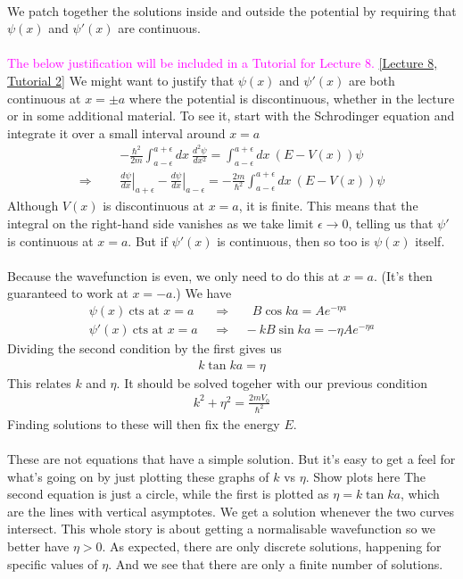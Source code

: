\documentclass[12pt]{article}
\def\be{\begin{eqnarray}}
\def\ee{\end{eqnarray}}
\newcommand{\nn}{\nonumber}
\newcommand\para{\paragraph{}}
\newcommand{\co}{\color{olive}}
\newcommand{\cblue}{\color{blue}}
\newcommand{\alyssa}{\textcolor{magenta}}
\begin{document}
\para
{\co We patch together the solutions inside and outside the potential by requiring that $\psi(x)$ and $\psi'(x)$ are continuous.}


\para
\alyssa{The below justification will be included in a Tutorial for Lecture 8.} \href{https://drive.google.com/file/d/1gpp5nltJft6RJ99iGAlz_Bhno3Qyn4yf/view?usp=drive_link}{[Lecture 8, Tutorial 2]}
{\cblue  We might want to justify that  $\psi(x)$ and $\psi'(x)$ are both continuous at $x=\pm a$ where the potential is discontinuous, whether  in the lecture or in some additional material. To see it,  start with the Schrodinger equation and integrate it over a small interval around $x=a$
%
\be && -\frac{\hbar^2}{2m} \int_{a-\epsilon}^{a+\epsilon}dx\ \frac{d^2\psi}{dx^2} =  \int_{a-\epsilon}^{a+\epsilon}dx\ (E-V(x))\psi \nn\\
\Longrightarrow \ \ \ && \left.\frac{d\psi}{dx}\right|_{a+\epsilon} - \left.\frac{d\psi}{dx}\right|_{a-\epsilon} = -\frac{2m}{\hbar^2} \int_{a-\epsilon}^{a+\epsilon}dx\ (E-V(x))\psi  \nn\ee
%
Although $V(x)$ is discontinuous at $x=a$, it is finite. This means that the integral on the right-hand side vanishes as we take limit $\epsilon \rightarrow 0$, telling us that $\psi'$ is continuous at $x=a$. But if $\psi'(x)$ is continuous, then so too is $\psi(x)$ itself. }

\para
{\co Because the wavefunction is even, we only need to do this at $x=a$. (It's then guaranteed to work at $x=-a$.) We have
%
%
\be \psi(x)\ \mbox{cts at $x=a$} \ \ \ &\Longrightarrow& \ \ \ \ \ B\cos ka = Ae^{-\eta a} \nn\\ 
\psi'(x)\ \mbox{cts at $x=a$} \ \ \ &\Longrightarrow& \ \ -kB\sin ka = -\eta Ae^{-\eta a} \nn\ee
%
}
Dividing the second condition by the first gives us 
{\co 
%
\be k\tan ka = \eta\nn\ee
%
This relates $k$ and $\eta$. It should be solved togeher with our previous condition 
%
\be k^2 + \eta^2 = \frac{2mV_0}{\hbar^2}\nn\ee
%
Finding solutions to these will then fix the energy $E$.}

\para
These are not equations that have a simple solution. But it's easy to get a feel for what's going on by just plotting these graphs of $k$ vs $\eta$. {\cblue Show plots here} The second equation is just a circle, while the first is plotted as $\eta = k\tan ka$, which are the lines with vertical asymptotes.  We get a solution whenever the two curves intersect.  This whole story is about getting a normalisable wavefunction so we better have $\eta>0$. As expected, there are  only discrete solutions, happening for specific values of $\eta$. And we see that there are only a finite number of solutions.
\end{document}
